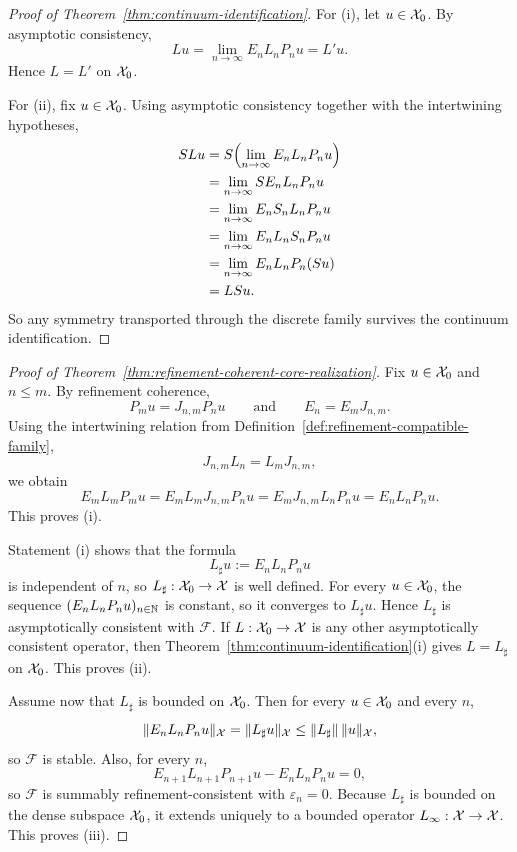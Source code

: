 \begin{proof}[Proof of Theorem~\ref{thm:continuum-identification}]
\label{proof:thm:continuum-identification}
For (i), let $u\in\mathcal{X}_0$. By asymptotic consistency,
\[
Lu=\lim_{n\to\infty}E_nL_nP_nu=L'u.
\]
Hence $L=L'$ on $\mathcal{X}_0$.

For (ii), fix $u\in\mathcal{X}_0$. Using asymptotic consistency together with the
intertwining hypotheses,
\begin{align*}
SLu
&=
S\Bigl(\lim_{n\to\infty}E_nL_nP_nu\Bigr) \\
&=
\lim_{n\to\infty}SE_nL_nP_nu \\
&=
\lim_{n\to\infty}E_nS_nL_nP_nu \\
&=
\lim_{n\to\infty}E_nL_nS_nP_nu \\
&=
\lim_{n\to\infty}E_nL_nP_n(Su) \\
&=
LSu.
\end{align*}
So any symmetry transported through the discrete family survives the continuum
identification.
\end{proof}

\begin{proof}[Proof of Theorem~\ref{thm:refinement-coherent-core-realization}]
\label{proof:thm:refinement-coherent-core-realization}
Fix \(u\in\mathcal{X}_0\) and \(n\le m\). By refinement coherence,
\[
P_m u = J_{n,m}P_nu
\qquad\text{and}\qquad
E_n = E_mJ_{n,m}.
\]
Using the intertwining relation from
Definition~\ref{def:refinement-compatible-family},
\[
J_{n,m}L_n = L_mJ_{n,m},
\]
we obtain
\[
E_mL_mP_mu
=
E_mL_mJ_{n,m}P_nu
=
E_mJ_{n,m}L_nP_nu
=
E_nL_nP_nu.
\]
This proves (i).

Statement (i) shows that the formula
\[
L_\sharp u:=E_nL_nP_nu
\]
is independent of \(n\), so \(L_\sharp:\mathcal{X}_0\to\mathcal{X}\) is well defined. For
every \(u\in\mathcal{X}_0\), the sequence \((E_nL_nP_nu)_{n\in\mathbb{N}}\) is constant, so
it converges to \(L_\sharp u\). Hence \(L_\sharp\) is asymptotically
consistent with \(\mathcal F\). If \(L:\mathcal{X}_0\to\mathcal{X}\) is any other
asymptotically consistent operator, then
Theorem~\ref{thm:continuum-identification}(i) gives \(L=L_\sharp\) on
\(\mathcal{X}_0\). This proves (ii).

Assume now that \(L_\sharp\) is bounded on \(\mathcal{X}_0\). Then for every
\(u\in\mathcal{X}_0\) and every \(n\),
\[
\|E_nL_nP_nu\|_{\mathcal{X}}
=
\|L_\sharp u\|_{\mathcal{X}}
\le
\|L_\sharp\|\,\|u\|_{\mathcal{X}},
\]
so \(\mathcal F\) is stable. Also, for every \(n\),
\[
E_{n+1}L_{n+1}P_{n+1}u-E_nL_nP_nu=0,
\]
so \(\mathcal F\) is summably refinement-consistent with
\(\varepsilon_n=0\). Because \(L_\sharp\) is bounded on the dense subspace
\(\mathcal{X}_0\), it extends uniquely to a bounded operator \(L_\infty:\mathcal{X}\to\mathcal{X}\).
This proves (iii).
\end{proof}

